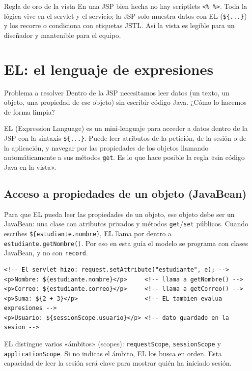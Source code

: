 \documentclass[11pt]{article}
\begin{document}
\begin{cajawarn}{Regla de oro de la vista}
En una JSP bien hecha no hay scriptlets \texttt{\textless{}\% \%\textgreater{}}. Toda la lógica vive en el servlet y el servicio; la JSP solo muestra datos con EL (\texttt{\$\{.\allowbreak{}.\allowbreak{}.\allowbreak{}\}}) y los recorre o condiciona con etiquetas JSTL. Así la vista es legible para un diseñador y mantenible para el equipo.\par
\end{cajawarn}
\section{EL: el lenguaje de expresiones}
\begin{cajaproblema}{Problema a resolver}
Dentro de la JSP necesitamos leer datos (un texto, un objeto, una propiedad de ese objeto) sin escribir código Java. ¿Cómo lo hacemos de forma limpia?\par
\end{cajaproblema}
EL (Expression Language) es un mini-lenguaje para acceder a datos dentro de la JSP con la sintaxis \texttt{\$\{.\allowbreak{}.\allowbreak{}.\allowbreak{}\}}. Puede leer atributos de la petición, de la sesión o de la aplicación, y navegar por las propiedades de los objetos llamando automáticamente a sus métodos \texttt{get}. Es lo que hace posible la regla «sin código Java en la vista».

\subsection{Acceso a propiedades de un objeto (JavaBean)}
Para que EL pueda leer las propiedades de un objeto, ese objeto debe ser un JavaBean: una clase con atributos privados y métodos \texttt{get}/\texttt{set} públicos. Cuando escribes \texttt{\$\{estudiante.\allowbreak{}nombre\}}, EL llama por dentro a \texttt{estudiante.\allowbreak{}get\allowbreak{}Nombre()}. Por eso en esta guía el modelo se programa con clases JavaBean, y no con \texttt{record}.

\begin{cajacodigo}
\begin{lstlisting}[style=markup]
<!-- El servlet hizo: request.setAttribute("estudiante", e); -->
<p>Nombre: ${estudiante.nombre}</p>     <!-- llama a getNombre() -->
<p>Correo: ${estudiante.correo}</p>     <!-- llama a getCorreo() -->
<p>Suma: ${2 + 3}</p>                   <!-- EL tambien evalua expresiones -->
<p>Usuario: ${sessionScope.usuario}</p> <!-- dato guardado en la sesion -->
\end{lstlisting}
\end{cajacodigo}
\vspace{2pt}
EL distingue varios «ámbitos» (scopes): \texttt{request\allowbreak{}Scope}, \texttt{session\allowbreak{}Scope} y \texttt{application\allowbreak{}Scope}. Si no indicas el ámbito, EL los busca en orden. Esta capacidad de leer la sesión será clave para mostrar quién ha iniciado sesión.
\end{document}
